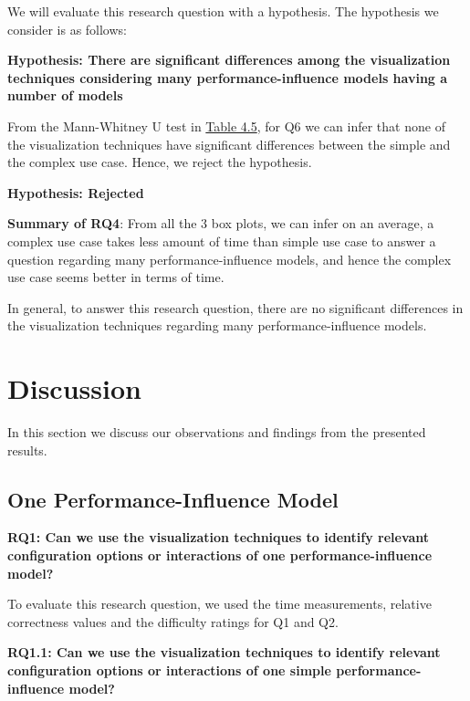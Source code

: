 \begin{description}[leftmargin=0pt]
We will evaluate this research question with a hypothesis. The hypothesis we consider is as follows:

\begin{mdframed}
\textbf {Hypothesis: There are significant differences among the visualization techniques considering many performance-influence models having a number of models}
\end{mdframed}

From the Mann-Whitney U test in \hyperref[table:q5q6MannWhitney]{Table 4.5}, for Q6 we can infer that none of the visualization techniques have significant differences between the simple and the complex use case. Hence, we reject the hypothesis.

\begin{mdframed}
\textbf {Hypothesis: Rejected}
\end{mdframed}
\end{description}

\textbf{Summary of RQ4}: From all the 3 box plots, we can infer on an average, a complex use case takes less amount of time than simple use case to answer a question regarding many performance-influence models, and hence the complex use case seems better in terms of time.

In general, to answer this research question, there are no significant differences in the visualization techniques regarding many performance-influence models.

\vskip 2.5in
\section{Discussion}
\label{sec:4.5}
In this section we discuss our observations and findings from the presented results. 

\subsection*{One Performance-Influence Model}
\vskip 0.2in
\begin{mdframed}
\textbf{RQ1: Can we use the visualization techniques to identify relevant configuration options or interactions  of one performance-influence model?}
\end{mdframed}

To evaluate this research question, we used the time measurements, relative correctness values and the difficulty ratings for Q1 and Q2.

\vskip 0.2in
\begin{mdframed}
\textbf{RQ1.1: Can we use the visualization techniques to identify relevant configuration options or interactions  of one simple performance-influence model?}
\end{mdframed}

